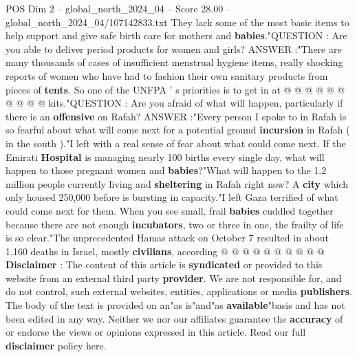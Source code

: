 \begin{textsample}{POS Dim 2 – global\_north\_2024\_04 – Score 28.00 – global\_north\_2024\_04/107142833.txt}
They lack some of the most basic items to help support and give safe birth care for mothers and \textbf{babies}."QUESTION : Are you able to deliver period products for women and girls?
ANSWER :"There are many thousands of cases of insufficient menstrual hygiene items, really shocking reports of women who have had to fashion their own sanitary products from pieces of \textbf{tents}.
So one of the UNFPA ' s priorities is to get in at @ @ @ @ @ @ @ @ @ @ kits."QUESTION : Are you afraid of what will happen, particularly if there is an \textbf{offensive} on Rafah?
ANSWER :"Every person I spoke to in Rafah is so fearful about what will come next for a potential ground \textbf{incursion} in Rafah ( in the south )."I left with a real sense of fear about what could come next.
If the Emirati \textbf{Hospital} is managing nearly 100 births every single day, what will happen to those pregnant women and \textbf{babies}?"What will happen to the 1.2 million people currently living and \textbf{sheltering} in Rafah right now?
A \textbf{city} which only housed 250,000 before is bursting in capacity."I left Gaza terrified of what could come next for them.
When you see small, frail \textbf{babies} cuddled together because there are not enough \textbf{incubators}, two or three in one, the frailty of life is so clear."The unprecedented Hamas attack on October 7 resulted in about 1,160 deaths in Israel, mostly \textbf{civilians}, according @ @ @ @ @ @ @ @ @ @ \textbf{Disclaimer} : The content of this article is \textbf{syndicated} or provided to this website from an external third party \textbf{provider}.
We are not responsible for, and do not control, such external websites, entities, applications or media \textbf{publishers}.
The body of the text is provided on an"as is"and"as \textbf{available}"basis and has not been edited in any way.
Neither we nor our affiliates guarantee the \textbf{accuracy} of or endorse the views or opinions expressed in this article.
Read our full \textbf{disclaimer} policy here.

\end{textsample}
